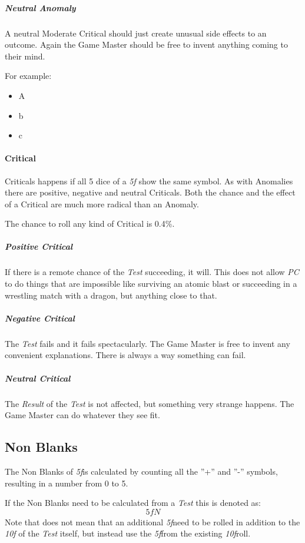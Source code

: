 \subparagraph{Neutral Anomaly}
A neutral Moderate Critical should just create unusual side effects to an outcome.
Again the Game Master should be free to invent anything coming to their mind.

For example:
\begin{itemize}[parsep=0em]
    \item A
    \item b
    \item c
\end{itemize}

\paragraph{Critical}
Criticals happens if all 5 dice of a \emph{5f} show the same symbol. As with Anomalies
there are positive, negative and neutral Criticals. Both the chance and the effect of
a Critical are much more radical than an Anomaly.

The chance to roll any kind of Critical is 0.4\%.

\subparagraph{Positive Critical}

If there is a remote chance of the \emph{Test} succeeding, it will. This does not
allow \emph{PC} to do things that are impossible like surviving an atomic blast or
succeeding in a wrestling match with a dragon, but anything close to that.

\subparagraph{Negative Critical}

The \emph{Test} fails and it fails spectacularly. The Game Master is free to invent
any convenient explanations. There is always a way something can fail.

\subparagraph{Neutral Critical}

The \emph{Result} of the \emph{Test} is not affected, but something very strange
happens. The Game Master can do whatever they see fit.


\subsection{Non Blanks}

The Non Blanks of \emph{5f}is calculated by counting all the ''+'' and ''-''
symbols, resulting in a number from 0 to 5.

If the Non Blanks need to be calculated from a \emph{Test} this is denoted as:
\[ \textit{5fN} \]
Note that does not mean that an additional \emph{5f}need to be rolled in addition to
the \emph{10f} of the \emph{Test} itself, but instead use the \emph{5f}from the
existing \emph{10f}roll.


